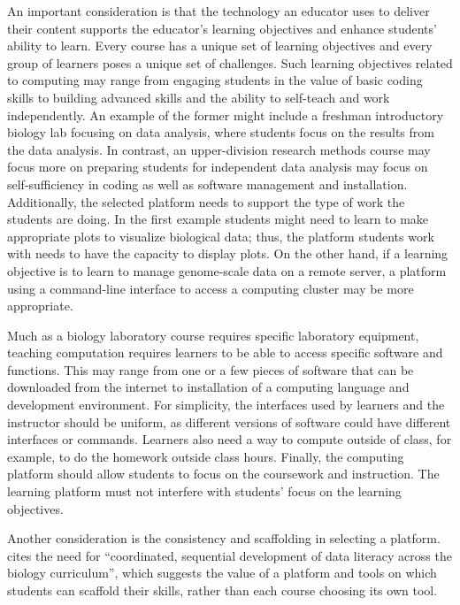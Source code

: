 An important consideration is that the technology an educator uses to deliver their content supports the educator's learning objectives and enhance students' ability to learn. 
Every course has a unique set of learning objectives and
every group of learners poses a unique set of challenges. 
Such learning objectives related to computing may range from engaging students in the value of basic coding skills to building advanced skills and the ability to self-teach and work independently.
An example of the former might include a freshman introductory biology lab focusing on data analysis, where students focus on the results from the data analysis. 
In contrast, an upper-division research methods course may focus more on preparing students for independent data analysis may focus on self-sufficiency in coding as well as software management and installation.
Additionally, the selected platform needs to support the type of work the students are doing.
In the first example students might need to learn to make appropriate plots to visualize biological data; thus, the platform students work with needs to have the capacity to display plots.
On the other hand, if a learning objective is to learn to manage genome-scale data on a remote server, a platform using a command-line interface to access a computing cluster may be more appropriate.

Much as a biology laboratory course requires specific laboratory equipment, teaching computation requires learners to be able to access specific software and functions.
This may range from one or a few pieces of software that can be downloaded from the internet
to installation of a computing language and development environment.
For simplicity,
the interfaces used by learners and the instructor should be uniform, as different versions of software could have different interfaces or commands.
Learners also need  a way to compute outside of class, for example, to do the homework outside class hours.
Finally, the computing platform should allow students to focus on the coursework and instruction. 
The learning platform must not interfere with students' focus on the learning objectives.

Another consideration is the consistency and scaffolding in selecting a platform.
\citet{Gibson18} cites the need for ``coordinated, sequential development of data literacy across the biology curriculum'',
which suggests the value of a platform and tools on which students can scaffold their skills,
rather than each course choosing its own tool.



